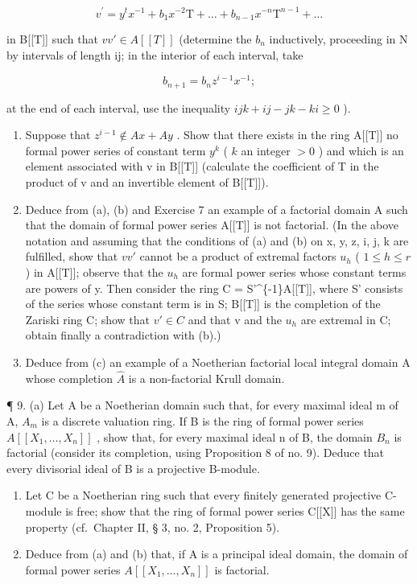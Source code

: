 \[
v ^ {\prime} = y ^ {t} x ^ {- 1} + b _ {1} x ^ {- 2} \mathrm{T} + \dots + b _ {n - 1} x ^ {- n} \mathrm{T} ^ {n - 1} + \dots
\]

in B{[}{[}T{]}{]} such that \(vv' \in A[[T]]\) (determine the \(b_{n}\) inductively, proceeding in N by intervals of length ij; in the interior of each interval, take

\[
b _ {n + 1} = b _ {n} z ^ {i - 1} x ^ {- 1};
\]

at the end of each interval, use the inequality \(ijk + ij - jk - ki \geqslant 0\) ).

\begin{enumerate}
\def\labelenumi{(\alph{enumi})}
\setcounter{enumi}{1}
\item
  Suppose that \(z^{i-1} \notin Ax + Ay\) . Show that there exists in the ring A{[}{[}T{]}{]} no formal power series of constant term \(y^k\) ( \(k\) an integer \(>0\) ) and which is an element associated with v in B{[}{[}T{]}{]} (calculate the coefficient of T in the product of v and an invertible element of B{[}{[}T{]}{]}).
\item
  Deduce from (a), (b) and Exercise 7 an example of a factorial domain A such that the domain of formal power series A{[}{[}T{]}{]} is not factorial. (In the above notation and assuming that the conditions of (a) and (b) on x, y, z, i, j, k are fulfilled, show that \(vv'\) cannot be a product of extremal factors \(u_{h}\) ( \(1 \leqslant h \leqslant r\) ) in A{[}{[}T{]}{]}; observe that the \(u_{h}\) are formal power series whose constant terms are powers of y. Then consider the ring C = S'\^{}\{-1\}A{[}{[}T{]}{]}, where S' consists of the series whose constant term is in S; B{[}{[}T{]}{]} is the completion of the Zariski ring C; show that \(v' \in C\) and that v and the \(u_{h}\) are extremal in C; obtain finally a contradiction with (b).)
\item
  Deduce from (c) an example of a Noetherian factorial local integral domain A whose completion \(\hat{A}\) is a non-factorial Krull domain.
\end{enumerate}

¶ 9. (a) Let A be a Noetherian domain such that, for every maximal ideal m of A, \(A_{m}\) is a discrete valuation ring. If B is the ring of formal power series \(A[[X_{1},\ldots,X_{n}]]\) , show that, for every maximal ideal n of B, the domain \(B_{n}\) is factorial (consider its completion, using Proposition 8 of no. 9). Deduce that every divisorial ideal of B is a projective B-module.

\begin{enumerate}
\def\labelenumi{(\alph{enumi})}
\setcounter{enumi}{1}
\item
  Let C be a Noetherian ring such that every finitely generated projective C-module is free; show that the ring of formal power series C{[}{[}X{]}{]} has the same property (cf.~Chapter II, § 3, no. 2, Proposition 5).
\item
  Deduce from (a) and (b) that, if A is a principal ideal domain, the domain of formal power series \(A[[X_{1},\ldots,X_{n}]]\) is factorial.
\end{enumerate}

